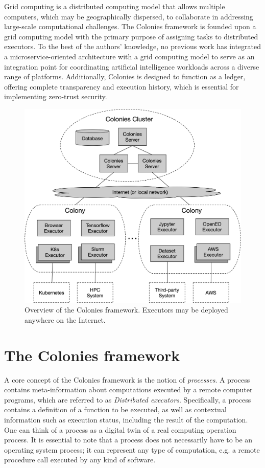 \documentclass{article}
\begin{document}
Grid computing \cite{grid_computing} is a distributed computing model that allows multiple computers, which may be geographically dispersed, to collaborate in addressing large-scale computational challenges. The Colonies framework is founded upon a grid computing model with the primary purpose of assigning tasks to distributed executors. To the best of the authors' knowledge, no previous work has integrated a microservice-oriented architecture with a grid computing model to serve as an integration point for coordinating artificial intelligence workloads across a diverse range of platforms. Additionally, Colonies is designed to function as a ledger, offering complete transparency and execution history, which is essential for implementing zero-trust security.

\begin{figure}[t]
	\centering
    \includegraphics[scale=0.45]{overview.png}
	\caption{Overview of the Colonies framework. Executors may be deployed anywhere on the Internet.}
	\label{fig:overview}
\end{figure}

\section{The Colonies framework}
\label{sec:headings}
A core concept of the Colonies framework is the notion of \emph{processes}. A process contains meta-information about computations executed by a remote computer programs, which are referred to as \emph{Distributed executors}. Specifically, a process contains a definition of a function to be executed, as well as contextual information such as execution status, including the result of the computation. One can think of a process as a digital twin of a real computing operation process. It is essential to note that a process does not necessarily have to be an operating system process; it can represent any type of computation, e.g. a remote procedure call executed by any kind of software. 
\end{document}
